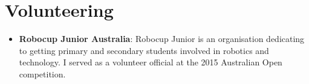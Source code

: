 \documentclass[a4paper,11pt]{article}
\newcommand{\resumeItem}[2]{
  \item\small{
    \textbf{#1}{: #2 \vspace{-2pt}}
  }
}
\newcommand{\resumeSubHeadingListStart}{\begin{itemize}[label={}, leftmargin=*]}
\newcommand{\resumeSubHeadingListEnd}{\end{itemize}}
\begin{document}
\section{Volunteering}
\resumeSubHeadingListStart
\resumeItem{Robocup Junior Australia}
    {Robocup Junior is an organisation dedicating to getting primary and secondary students involved in robotics and technology. I served as a volunteer official at the 2015 Australian Open competition.}
\resumeSubHeadingListEnd

\end{document}
